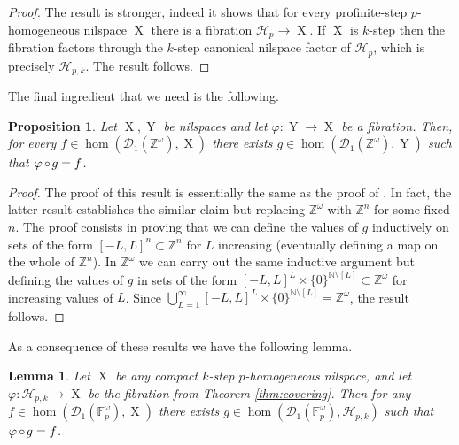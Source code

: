 \documentclass[a4paper,12pt,reqno]{amsart}
\newtheorem{lemma}[theorem]{Lemma}
\newtheorem{proposition}[theorem]{Proposition}
\theoremstyle{definition}
\newcommand{\mc}{\mathcal}
\newcommand{\mb}{\mathbb}
\DeclareMathOperator{\ns}{X}
\DeclareMathOperator{\nss}{Y}
\DeclareMathOperator{\co}{\circ\hspace{-0.02 cm}}
\begin{document}
\begin{proof}
The result \cite[Theorem 4.3]{CGSS-aff-ex} is stronger, indeed it shows that for every profinite-step $p$-homogeneous nilspace $\ns$  there is a fibration $\mc{H}_p\to\ns$. If $\ns$ is $k$-step then the fibration factors through the $k$-step canonical nilspace factor of $\mc{H}_p$, which is precisely $\mc{H}_{p,k}$. The result follows.
\end{proof}

The final ingredient that we need is the following.

\begin{proposition}\label{prop:lifting}
Let $\ns,\nss$ be nilspaces and let $\varphi:\nss\to \ns$ be a fibration. Then, for every $f\in \hom(\mc{D}_1(\mb{Z}^\omega),\ns)$ there exists $g\in \hom(\mc{D}_1(\mb{Z}^\omega),\nss)$ such that $\varphi \co g = f$.
\end{proposition}

\begin{proof}
The proof of this result is essentially the same as the proof of \cite[Corollary A.6]{CGSS-p-hom}. In fact, the latter result establishes the similar claim but replacing $\mb{Z}^\omega$ with $\mb{Z}^n$ for some fixed $n$. The proof consists in proving that  we can define the values of $g$ inductively on sets of the form $[-L,L]^n\subset \mb{Z}^n$ for $L$ increasing (eventually defining a map on the whole of $\mb{Z}^n$). In $\mb{Z}^\omega$ we can carry out the same inductive argument but defining the values of $g$ in sets of the form $[-L,L]^L\times \{0\}^{\mb{N}\setminus[L]}\subset \mb{Z}^\omega$ for increasing values of $L$. Since $\bigcup_{L=1}^\infty [-L,L]^L\times \{0\}^{\mb{N}\setminus[L]} = \mb{Z}^\omega$, the result follows.
\end{proof}

As a consequence of these results we have the following lemma.

\begin{lemma}\label{lem:lift}
Let $\ns$ be any compact $k$-step $p$-homogeneous nilspace, and let $\varphi:\mc{H}_{p,k}\to \ns$ be the fibration from Theorem \ref{thm:covering}. Then for any $f\in \hom(\mc{D}_1(\mb{F}_p^\omega),\ns)$ there exists $g\in \hom(\mc{D}_1(\mb{F}_p^\omega),\mc{H}_{p,k})$ such that $\varphi \co g = f$.
\end{lemma}
\end{document}
